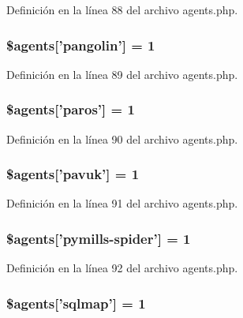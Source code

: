 Definición en la línea 88 del archivo agents.\-php.

\hypertarget{agents_8php_ab0821e3b43c8905694a07364bf593f2c}{
\subsubsection[{\$agents}]{\setlength{\rightskip}{0pt plus 5cm}\$agents\mbox{[}'pangolin'\mbox{]} = 1}}\label{agents_8php_ab0821e3b43c8905694a07364bf593f2c}


Definición en la línea 89 del archivo agents.\-php.

\hypertarget{agents_8php_ac9d01a024216076bd833b147eb7a875d}{
\subsubsection[{\$agents}]{\setlength{\rightskip}{0pt plus 5cm}\$agents\mbox{[}'paros'\mbox{]} = 1}}\label{agents_8php_ac9d01a024216076bd833b147eb7a875d}


Definición en la línea 90 del archivo agents.\-php.

\hypertarget{agents_8php_af7f656bf1d9dba88f9f2f564e51b9ee9}{
\subsubsection[{\$agents}]{\setlength{\rightskip}{0pt plus 5cm}\$agents\mbox{[}'pavuk'\mbox{]} = 1}}\label{agents_8php_af7f656bf1d9dba88f9f2f564e51b9ee9}


Definición en la línea 91 del archivo agents.\-php.

\hypertarget{agents_8php_af0a68ce87585d4350c0680a04915f531}{
\subsubsection[{\$agents}]{\setlength{\rightskip}{0pt plus 5cm}\$agents\mbox{[}'pymills-\/spider'\mbox{]} = 1}}\label{agents_8php_af0a68ce87585d4350c0680a04915f531}


Definición en la línea 92 del archivo agents.\-php.

\hypertarget{agents_8php_ad1494dc4533e5ad2df97370dc3262733}{
\subsubsection[{\$agents}]{\setlength{\rightskip}{0pt plus 5cm}\$agents\mbox{[}'sqlmap'\mbox{]} = 1}}\label{agents_8php_ad1494dc4533e5ad2df97370dc3262733}


